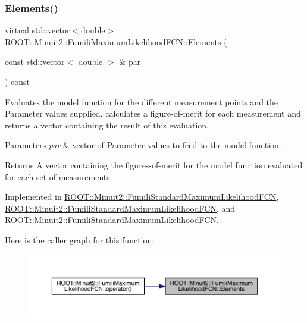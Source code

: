 \subsubsection{\texorpdfstring{Elements()}{Elements()}\hspace{0.1cm}{\footnotesize\ttfamily [1/3]}}
{\footnotesize\ttfamily virtual std\+::vector$<$double$>$ R\+O\+O\+T\+::\+Minuit2\+::\+Fumili\+Maximum\+Likelihood\+F\+C\+N\+::\+Elements (\begin{DoxyParamCaption}\item[{const std\+::vector$<$ double $>$ \&}]{par }\end{DoxyParamCaption}) const\hspace{0.3cm}{\ttfamily [pure virtual]}}

Evaluates the model function for the different measurement points and the Parameter values supplied, calculates a figure-\/of-\/merit for each measurement and returns a vector containing the result of this evaluation.


\begin{DoxyParams}{Parameters}
{\em par} & vector of Parameter values to feed to the model function.\\
\hline
\end{DoxyParams}
\begin{DoxyReturn}{Returns}
A vector containing the figures-\/of-\/merit for the model function evaluated for each set of measurements. 
\end{DoxyReturn}


Implemented in \mbox{\hyperlink{classROOT_1_1Minuit2_1_1FumiliStandardMaximumLikelihoodFCN_a19866fac44787dee8e2a6a35e7a15fe1}{R\+O\+O\+T\+::\+Minuit2\+::\+Fumili\+Standard\+Maximum\+Likelihood\+F\+CN}}, \mbox{\hyperlink{classROOT_1_1Minuit2_1_1FumiliStandardMaximumLikelihoodFCN_af104474f9095c245b467f9db554a126a}{R\+O\+O\+T\+::\+Minuit2\+::\+Fumili\+Standard\+Maximum\+Likelihood\+F\+CN}}, and \mbox{\hyperlink{classROOT_1_1Minuit2_1_1FumiliStandardMaximumLikelihoodFCN_af104474f9095c245b467f9db554a126a}{R\+O\+O\+T\+::\+Minuit2\+::\+Fumili\+Standard\+Maximum\+Likelihood\+F\+CN}}.

Here is the caller graph for this function\+:
\nopagebreak
\begin{figure}[H]
\begin{center}
\leavevmode
\includegraphics[width=350pt]{dd/d54/classROOT_1_1Minuit2_1_1FumiliMaximumLikelihoodFCN_a20aa81dc23ba61ed49ba78f4f9627e59_icgraph}
\end{center}
\end{figure}
\mbox{\label{classROOT_1_1Minuit2_1_1FumiliMaximumLikelihoodFCN_a20aa81dc23ba61ed49ba78f4f9627e59}} 
